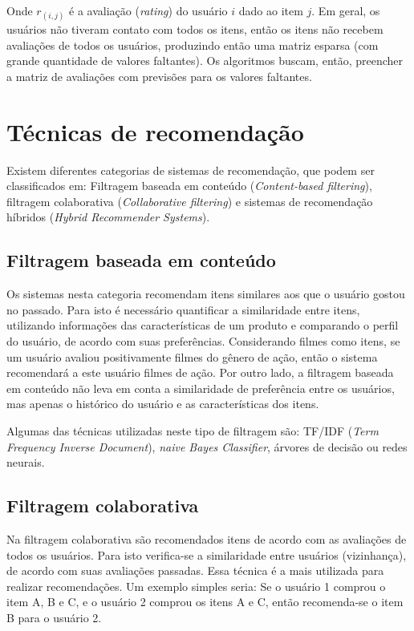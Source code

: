 \documentclass[12pt,a4paper,header]{abnt}
\begin{document}
Onde $r_{(i, j)}$ é a avaliação (\textit{rating}) do usuário $i$ dado ao item $j$. Em geral, os usuários não tiveram contato com todos os itens, então os itens não recebem avaliações de todos os usuários, produzindo então uma matriz esparsa (com grande quantidade de valores faltantes). Os algoritmos buscam, então, preencher a matriz de avaliações com previsões para os valores faltantes.

\section{Técnicas de recomendação}

Existem diferentes categorias de sistemas de recomendação, que podem ser classificados em: Filtragem baseada em conteúdo (\textit{Content-based filtering}), filtragem colaborativa (\textit{Collaborative filtering}) e sistemas de recomendação híbridos (\textit{Hybrid Recommender Systems})\cite{melville2011recommender}.

\subsection{Filtragem baseada em conteúdo}

Os sistemas nesta categoria recomendam itens similares aos que o usuário gostou no passado\cite{gorakala2015building}. Para isto é necessário quantificar a similaridade entre itens, utilizando informações das características de um produto\cite{shapira2011recommender} e comparando o perfil do usuário, de acordo com suas preferências. Considerando filmes como itens, se um usuário avaliou positivamente filmes do gênero de ação, então o sistema recomendará a este usuário filmes de ação. Por outro lado, a filtragem baseada em conteúdo não leva em conta a similaridade de preferência entre os usuários, mas apenas o histórico do usuário e as características dos itens\cite{gorakala2015building}.

Algumas das técnicas utilizadas neste tipo de filtragem são: TF/IDF (\textit{Term Frequency Inverse Document}), \textit{naive Bayes Classifier}, árvores de decisão ou redes neurais\cite{isinkaye2015recommendation}. 

\subsection{Filtragem colaborativa}

Na filtragem colaborativa são recomendados itens de acordo com as avaliações de todos os usuários\cite{melville2011recommender}. Para isto verifica-se a similaridade entre usuários (vizinhança), de acordo com suas avaliações passadas. Essa técnica é a mais utilizada para realizar recomendações\cite{shapira2011recommender}. Um exemplo simples seria: Se o usuário 1 comprou o item A, B e C, e o usuário 2 comprou os itens A e C, então recomenda-se o item B para o usuário 2.
\end{document}
